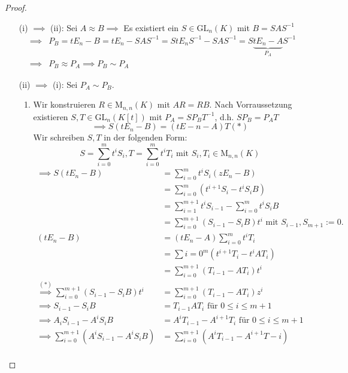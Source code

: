\documentclass[a4paper, titlepage]{article}
\theoremstyle{definition}
\newcommand{\GL}{\mathrm{GL}}
\newcommand{\M}{\mathrm{M}}
\begin{document}
\begin{proof}
    \begin{enumerate}[(i) $\implies$ (ii):]
        \item [(i) $\implies$ (ii):] Sei $A\approx B\implies $ Es existiert ein $S\in\GL_n(K)$ mit $B=SAS^{-1}$ 
        \begin{align*}
            \implies& P_B=tE_n-B=tE_n-SAS^{-1}=StE_nS^{-1}-SAS^{-1}=S\underbrace{tE_n-A}_{P_A}S^{-1}\\
            \implies& P_B\approx P_A\implies P_B \sim P_A
        \end{align*}
        \item[(ii) $\implies$ (i):] Sei $P_A\sim P_B.$
        \begin{enumerate}
           \item  Wir konstruieren $R\in\M_{n,n}(K)$ mit $AR=RB$. Nach Vorraussetzung existieren $S,T\in\GL_{n}(K[t])$ mit $P_A=SP_BT^{-1}$, d.h. $SP_B=P_AT$
            $$ \implies S(tE_n-B)=(tE-n-A)T (\ast)$$
            Wir schreiben $S,T$ in der folgenden Form:
            $$S=\sum\limits_{i=0}^{m}t^{i}S_i, T=\sum\limits_{i=0}^{m}t^{i}T_i \text{ mit } S_i,T_i\in\M_{n,n}(K)$$
            \begin{align*}
                \implies S(tE_n-B)&=\sum\limits_{i=0}^{m}t^{i}S_i(zE_n-B)\\
                &= \sum\limits_{i=0}^{m}(t^{i+1}S_i-t^{i}S_iB)\\
                &= \sum\limits_{i=1}^{m+1}t^{i}S_{i-1}-\sum\limits_{i=0}^{m}t^{i}S_iB\\
                &= \sum\limits_{i=0}^{m+1}(S_{i-1}-S_iB)t^{i} \text{ mit } S_{i-1},S_{m+1}:=0.\\
                (tE_n-B)&= (tE_n-A)\sum\limits_{i=0}^{m}t^{i}T_i\\
                &= \sum{i=0}^{m}(t^{i+1}T_i-t^{i}AT_i)\\
                &= \sum\limits_{i=0}^{m+1}(T_{i-1}-AT_i)t^{i}\\
                \overset{(\ast)}{\implies} \sum\limits_{i=0}^{m+1}(S_{i-1}-S_iB)t^{i}&=\sum\limits_{i=0}^{m+1}(T_{i-1}-AT_i)z^{i}\\
                \implies S_{i-1}-S_iB &= T_{i-1}AT_{i} \text{ für } 0\leq i\leq m+1\\
                \implies A_iS_{i-1}-A^{i}S_iB&=A^{i}T_{i-1}-A^{i+1}T_i \text{ für } 0\leq i\leq m+1\\
                \implies \sum\limits_{i=0}^{m+1}(A^{i}S_{i-1}-A^{i}S_iB)&= \sum\limits_{i=0}^{m+1}(A^{i}T_{i-1}-A^{i+1}T-i)\\

\end{align*}
\end{enumerate}
\end{enumerate}
\end{proof}
\end{document}
